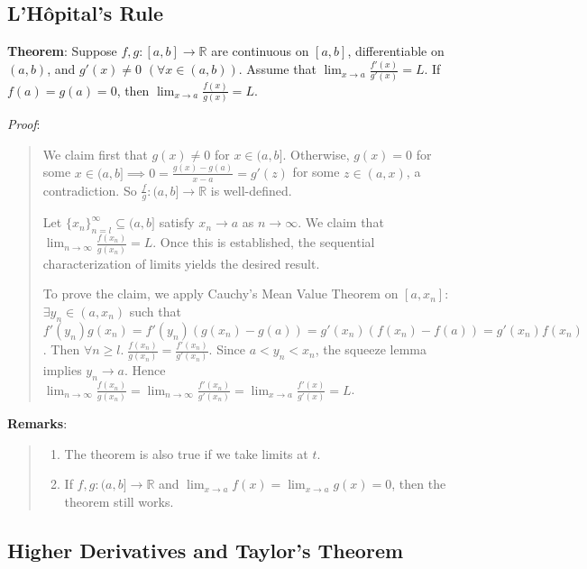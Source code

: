 \documentclass[11pt]{article}
\begin{document}
\subsection{L'H\^{o}pital's Rule}

\textbf{Theorem}: Suppose $f,g : [a,b] \to \mathbb{R}$ are continuous on $[a,b]$, differentiable on $(a,b)$, and $g'(x) \neq 0$ $(\forall x \in (a,b))$. Assume that $\lim_{x \to a} \frac{f'(x)}{g'(x)} = L$. If $f(a) = g(a) = 0$, then $\lim_{x \to a} \frac{f(x)}{g(x)} = L$.

\emph{Proof}:
\begin{quote}\vspace{-0.3cm}
We claim first that $g(x) \neq 0$ for $x \in (a,b]$. Otherwise, $g(x) = 0$ for some $x \in (a,b] \implies 0 = \frac{g(x) - g(a)}{x-a} = g'(z)$ for some $z \in (a,x)$, a contradiction. So $\frac{f}{g} : (a, b] \to \mathbb{R}$ is well-defined.

Let $\{x_n\}_{n=l}^\infty \subseteq (a,b]$ satisfy $x_n \to a$ as $n \to \infty$. We claim that $\lim_{n \to \infty} \frac{f(x_n)}{g(x_n)} = L$. Once this is established, the sequential characterization of limits yields the desired result.

To prove the claim, we apply Cauchy's Mean Value Theorem on $[a, x_n]$: $\exists y_n \in (a, x_n)$ such that $f'(y_n) g(x_n) = f'(y_n)(g(x_n) - g(a)) = g'(x_n) (f(x_n) - f(a)) = g'(x_n) f(x_n)$. Then $\forall n \geq l.\; \frac{f(x_n)}{g(x_n)} = \frac{f'(x_n)}{g'(x_n)}$. Since $a < y_n < x_n$, the squeeze lemma implies $y_n \to a$. Hence $\lim_{n \to \infty} \frac{f(x_n)}{g(x_n)} = \lim_{n \to \infty} \frac{f'(x_n)}{g'(x_n)} = \lim_{x \to a} \frac{f'(x)}{g'(x)} = L$.
\end{quote}

\textbf{Remarks}:
\begin{quote}\vspace{-0.3cm}
	\begin{enumerate}
	\item The theorem is also true if we take limits at $t$.
	\item If $f,g : (a,b] \to \mathbb{R}$ and $\lim_{x \to a} f(x) = \lim_{x \to a} g(x) = 0$, then the theorem still works.
	\end{enumerate}
\end{quote}

\subsection{Higher Derivatives and Taylor's Theorem}
\end{document}
